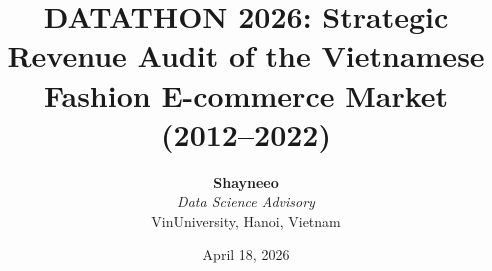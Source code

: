 
\title{DATATHON 2026: Strategic Revenue Audit of the Vietnamese Fashion E-commerce Market (2012--2022)}
\author{
  \textbf{Shayneeo}\\
  \textit{Data Science Advisory}\\
  VinUniversity, Hanoi, Vietnam
}
\date{April 18, 2026}